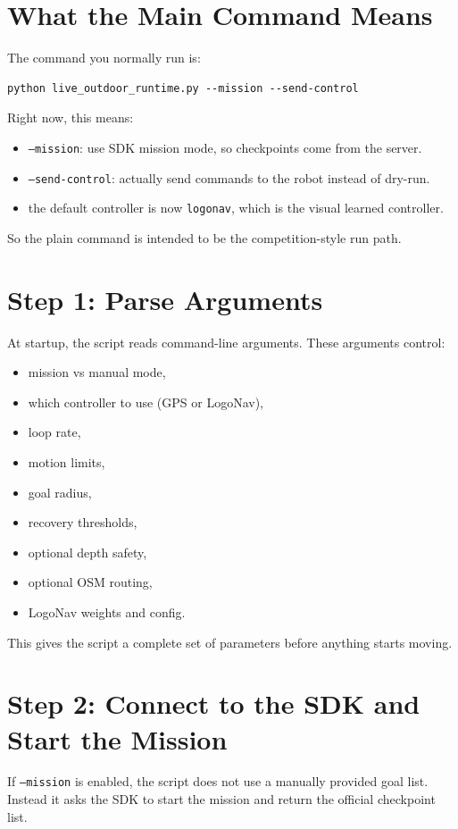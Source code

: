 \documentclass[11pt]{article}
\begin{document}
\section*{What the Main Command Means}
The command you normally run is:
\begin{verbatim}
python live_outdoor_runtime.py --mission --send-control
\end{verbatim}

Right now, this means:
\begin{itemize}[leftmargin=*]
\item \texttt{--mission}: use SDK mission mode, so checkpoints come from the server.
\item \texttt{--send-control}: actually send commands to the robot instead of dry-run.
\item the default controller is now \texttt{logonav}, which is the visual learned controller.
\end{itemize}

So the plain command is intended to be the competition-style run path.

\section*{Step 1: Parse Arguments}
At startup, the script reads command-line arguments.
These arguments control:
\begin{itemize}[leftmargin=*]
\item mission vs manual mode,
\item which controller to use (GPS or LogoNav),
\item loop rate,
\item motion limits,
\item goal radius,
\item recovery thresholds,
\item optional depth safety,
\item optional OSM routing,
\item LogoNav weights and config.
\end{itemize}

This gives the script a complete set of parameters before anything starts moving.

\section*{Step 2: Connect to the SDK and Start the Mission}
If \texttt{--mission} is enabled, the script does not use a manually provided goal list.
Instead it asks the SDK to start the mission and return the official checkpoint list.
\end{document}
